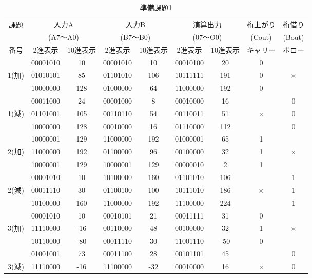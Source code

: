 \documentclass[11pt,a4j]{jsarticle}
\begin{document}
  \begin{table}[htb]
  \begin{center}
    \caption{準備課題1}
    \begin{tabular}{|c|c|c|c|c|c|c|c|c|} \hline
課題 & \multicolumn{2}{|c|}{入力A} & \multicolumn{2}{|c|}{入力B} & \multicolumn{2}{|c|}{演算出力} & 桁上がり & 桁借り\\
 & \multicolumn{2}{|c|}{(A7～A0)} & \multicolumn{2}{|c|}{(B7～B0)} & \multicolumn{2}{|c|}{(07～O0)} & (Cout) & (Bout) \\ \cline{2-7}
番号 & 2進表示 & 10進表示 & 2進表示 & 10進表示 & 2進表示 & 10進表示 & キャリー & ボロー \\ \hline
 & 00001010 & 10 & 00001010 &10  &00010100  & 20 & 0 &  \\ \cline{2-8}
1(加) & 01010101 & 85 & 01101010 &106  &10111111  & 191 & 0 & × \\ \cline{2-8}
 & 10000000 & 128 & 01000000 &64  & 11000000 & 192 & 0 &  \\ \hline
 & 00011000 &24  & 00001000 &8  &00010000  & 16 &  & 0 \\ \cline{2-7}\cline{9-9}
1(減) & 01101001 & 105 &00110110  &54  & 00110011 & 51 & × & 0 \\ \cline{2-7}\cline{9-9}
 & 10000000 & 128 &00010000  & 16 &01110000  & 112 &  & 0 \\ \hline
 & 10000001 & 129 &11000000  & 192 &01000001  &65  & 1 &  \\ \cline{2-8}
2(加) & 11000000 & 192 & 01100000 &96  &00100000  &32  & 1 & × \\ \cline{2-8}
 & 10000001 &  129& 10000001 & 129 &00000010  & 2 & 1 &  \\ \hline
 & 00001010 &10  &10100000  &160  &01101010  &106  &  & 1 \\ \cline{2-7}\cline{9-9}
2(減) & 00011110 &  30&01100100  & 100 & 10111010 &186  & × & 1 \\ \cline{2-7}\cline{9-9}
 & 10100000 & 160 &11000000  & 192 & 11100000 &224  &  & 1 \\ \hline
 &00001010  & 10 & 00010101 &21  & 00011111 &31  & 0 &  \\ \cline{2-8}
3(加) & 11110000 &-16  & 00110000 & 48 & 00100000 & 32 & 1 & × \\ \cline{2-8}
 & 10110000 & -80 &00011110  & 30 & 11001110 &-50  & 0 &  \\ \hline
 & 01001001 & 73 & 00011100 &28  & 00101101 &45  &  & 0 \\ \cline{2-7}\cline{9-9}
3(減) & 11110000 & -16 &11100000  & -32 &00010000  &16  & × & 0 \\ \cline{2-7}\cline{9-9}

\end{tabular}
\end{center}
\end{table}
\end{document}
